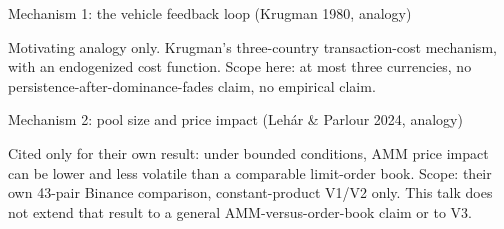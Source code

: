 \documentclass[aspectratio=169]{beamer}
\begin{document}
\begin{frame}{Mechanism 1: the vehicle feedback loop (Krugman 1980, analogy)}
  \begin{center}
  \end{center}
  {\footnotesize Motivating analogy only. Krugman's three-country transaction-cost mechanism, with an endogenized cost function. Scope here: at most three currencies, no persistence-after-dominance-fades claim, no empirical claim.}
\end{frame}

\begin{frame}{Mechanism 2: pool size and price impact (Leh\'ar \& Parlour 2024, analogy)}
  \begin{center}
  \end{center}
  {\footnotesize Cited only for their own result: under bounded conditions, AMM price impact can be lower and less volatile than a comparable limit-order book. Scope: their own 43-pair Binance comparison, constant-product V1/V2 only. This talk does not extend that result to a general AMM-versus-order-book claim or to V3.}
\end{frame}
\end{document}
